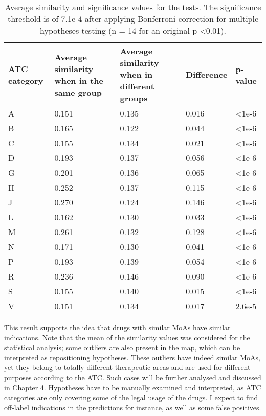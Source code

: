 \begin{table}[htbp]
\footnotesize
\begin{tabular}{|p{2cm}|p{3.5cm}|p{3.5cm}|p{2cm}|p{2cm}|}
\hline
\textbf{ATC category} & \textbf{Average similarity when in the same group} & \textbf{Average similarity when in different groups} & \textbf{Difference} & \textbf{p-value} \\ \hline
A & 0.151 & 0.135 & 0.016 & \textless 1e-6 \\ \hline
B & 0.165 & 0.122 & 0.044 & \textless 1e-6 \\ \hline
C & 0.155 & 0.134 & 0.021 & \textless 1e-6 \\ \hline
D & 0.193 & 0.137 & 0.056 & \textless 1e-6 \\ \hline
G & 0.201 & 0.136 & 0.065 & \textless 1e-6 \\ \hline
H & 0.252 & 0.137 & 0.115 & \textless 1e-6 \\ \hline
J & 0.270 & 0.124 & 0.146 & \textless 1e-6 \\ \hline
L & 0.162 & 0.130 & 0.033 & \textless 1e-6 \\ \hline
M & 0.261 & 0.132 & 0.128 & \textless 1e-6 \\ \hline
N & 0.171 & 0.130 & 0.041 & \textless 1e-6 \\ \hline
P & 0.193 & 0.139 & 0.054 & \textless 1e-6 \\ \hline
R & 0.236 & 0.146 & 0.090 & \textless 1e-6 \\ \hline
S & 0.155 & 0.140 & 0.015 & \textless 1e-6 \\ \hline
V & 0.151 & 0.134 & 0.017 & 2.6e-5 \\ \hline
\end{tabular}
\caption{Average similarity and significance values for the tests. The significance threshold is of 7.1e-4 after applying Bonferroni correction for multiple hypotheses testing (n = 14 for an original p \textless 0.01).}
\label{table:tablepvalues}
\end{table}

This result supports the idea that drugs with similar MoAs have similar indications. Note that the mean of the similarity values was considered for the statistical analysis; some outliers are also present in the map, which can be interpreted as repositioning hypotheses. These outliers have indeed similar MoAs, yet they belong to totally different therapeutic areas and are used for different purposes according to the ATC. Such cases will be further analysed and discussed in Chapter 4. Hypotheses have to be manually examined and interpreted, as ATC categories are only covering some of the legal usage of the drugs. I expect to find off-label indications in the predictions for instance, as well as some false positives.

